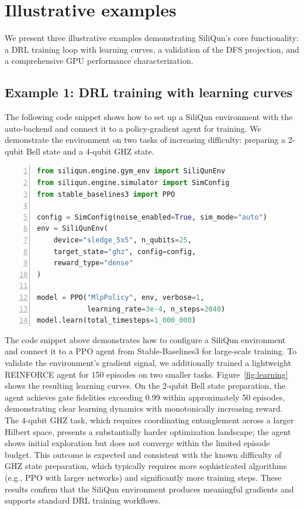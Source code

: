 \documentclass[preprint,12pt, a4paper]{elsarticle}
\begin{document}
\section{Illustrative examples}
\label{sec:examples}

We present three illustrative examples demonstrating SiliQun's core functionality: a DRL training loop with learning curves, a validation of the DFS projection, and a comprehensive GPU performance characterization.

\subsection{Example 1: DRL training with learning curves}

The following code snippet shows how to set up a SiliQun environment with the auto-backend and connect it to a policy-gradient agent for training. We demonstrate the environment on two tasks of increasing difficulty: preparing a 2-qubit Bell state and a 4-qubit GHZ state.

\begin{lstlisting}[language=Python, basicstyle=\footnotesize\ttfamily, backgroundcolor=\color{gray!10}, frame=single, numbers=left, numberstyle=\tiny\color{gray}]
from siliqun.engine.gym_env import SiliQunEnv
from siliqun.engine.simulator import SimConfig
from stable_baselines3 import PPO

config = SimConfig(noise_enabled=True, sim_mode="auto")
env = SiliQunEnv(
    device="sledge_5x5", n_qubits=25,
    target_state="ghz", config=config,
    reward_type="dense"
)

model = PPO("MlpPolicy", env, verbose=1,
            learning_rate=3e-4, n_steps=2048)
model.learn(total_timesteps=1_000_000)
\end{lstlisting}

The code snippet above demonstrates how to configure a SiliQun environment and connect it to a PPO agent from Stable-Baselines3 for large-scale training. To validate the environment's gradient signal, we additionally trained a lightweight REINFORCE agent for 150 episodes on two smaller tasks. Figure~\ref{fig:learning} shows the resulting learning curves. On the 2-qubit Bell state preparation, the agent achieves gate fidelities exceeding 0.99 within approximately 50 episodes, demonstrating clear learning dynamics with monotonically increasing reward. The 4-qubit GHZ task, which requires coordinating entanglement across a larger Hilbert space, presents a substantially harder optimization landscape; the agent shows initial exploration but does not converge within the limited episode budget. This outcome is expected and consistent with the known difficulty of GHZ state preparation, which typically requires more sophisticated algorithms (e.g., PPO with larger networks) and significantly more training steps. These results confirm that the SiliQun environment produces meaningful gradients and supports standard DRL training workflows.
\end{document}
